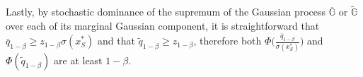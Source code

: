 \documentclass[mnsc,blindrev]{informs4} %
\newcommand{\norm}[1]{\left \Vert #1 \right\Vert}
\begin{document}
Lastly, by stochastic dominance of the supremum of the Gaussian process $\overline{\mathbb G}$ or $\tilde{\mathbb G}$ over each of its marginal Gaussian component, it is straightforward that $\bar{q}_{1-\beta}\geq z_{1-\beta}\sigma(x^*_S)$ and that $\tilde{q}_{1-\beta}\geq z_{1-\beta}$, therefore both $\Phi\big(\frac{\bar{q}_{1-\beta}}{\sigma(x^*_S)}\big)$ and $\Phi(\tilde{q}_{1-\beta})$ are at least $1-\beta$.\hfill\Halmos




\end{document}
